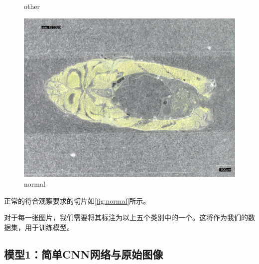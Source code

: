 \begin{figure}[H]
\begin{minipage}{0.32\textwidth}
        \caption{other}
        \label{fig:other}
    \end{minipage}
    \begin{minipage}{0.32\textwidth}
        \centering
        \includegraphics[width=\textwidth]{./fig/sample_1/normal.jpg}
        \caption{normal}
        \label{fig:normal}
    \end{minipage}
\end{figure}

正常的符合观察要求的切片如\autoref{fig:normal}所示。

对于每一张图片，我们需要将其标注为以上五个类别中的一个。这将作为我们的数据集，用于训练模型。

\subsection{模型1：简单CNN网络与原始图像}

